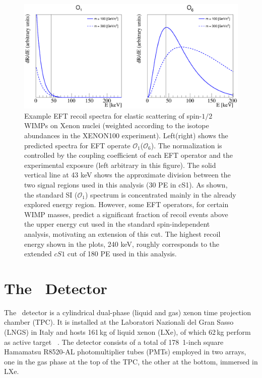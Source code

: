 \begin{figure}[h!]
\centerline{\includegraphics[width=1.\linewidth]{Figures/drdeO1O6.eps}}
\caption{Example EFT recoil spectra for elastic scattering of spin-$1/2$ WIMPs on Xenon nuclei (weighted according to the isotope abundances in the XENON100 experiment). Left(right) shows the predicted spectra for EFT operate $\mathcal{O}_1$($\mathcal{O}_6$). The normalization is controlled by the coupling coefficient of each EFT operator and the experimental exposure (left arbitrary in this figure). The solid vertical line at 43 keV shows the approximate division between the two signal regions used in this analysis (30 PE in cS1). As shown, the standard SI ($\mathcal{O}_1$) spectrum is concentrated mainly in the already explored energy region. However, some EFT operators, for certain WIMP masses, predict a significant fraction of recoil events above the upper energy cut used in the standard spin-independent analysis, motivating an extension of this cut. The highest recoil energy shown in the plots, 240 keV, roughly corresponds to the extended $cS1$ cut of 180 PE used in this analysis.}
\label{fig:dRdE}
\end{figure}

\section{The \Xehund\  Detector}
The \Xehund\ detector is a cylindrical %
dual-phase (liquid and gas) xenon time projection chamber (TPC). It is installed at the Laboratori Nazionali del Gran Sasso (LNGS) in Italy
and hosts 161\,kg of liquid xenon (LXe), of which 62\,kg perform as active target ~\cite{xe100_instr2012}. 
The detector consists of a total of 178~1-inch square Hamamatsu R8520-AL photomultiplier tubes (PMTs) employed in two arrays, one in the gas phase at the top of the TPC,
the other at the bottom, immersed in LXe. 

